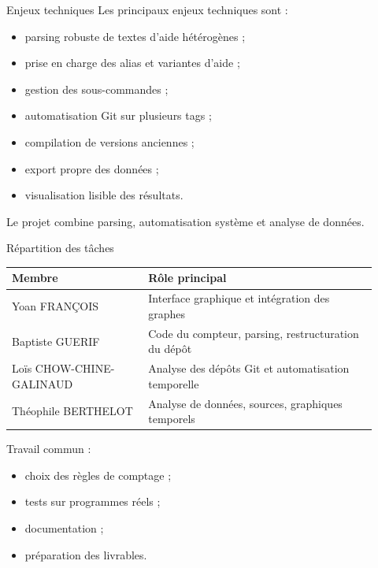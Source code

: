 \documentclass[10pt,aspectratio=169]{beamer}
\begin{document}
\begin{frame}{Enjeux techniques}
  Les principaux enjeux techniques sont :

  \begin{itemize}
    \item parsing robuste de textes d'aide hétérogènes ;
    \item prise en charge des alias et variantes d'aide ;
    \item gestion des sous-commandes ;
    \item automatisation Git sur plusieurs tags ;
    \item compilation de versions anciennes ;
    \item export propre des données ;
    \item visualisation lisible des résultats.
  \end{itemize}

  \vspace{0.3cm}
  Le projet combine parsing, automatisation système et analyse de données.
\end{frame}

\begin{frame}{Répartition des tâches}
  \small
  \begin{tabular}{p{0.34\linewidth} p{0.58\linewidth}}
    \toprule
    \textbf{Membre} & \textbf{Rôle principal} \\
    \midrule
    Yoan FRANÇOIS & Interface graphique et intégration des graphes \\
    Baptiste GUERIF & Code du compteur, parsing, restructuration du dépôt \\
    Loïs CHOW-CHINE-GALINAUD & Analyse des dépôts Git et automatisation temporelle \\
    Théophile BERTHELOT & Analyse de données, sources, graphiques temporels \\
    \bottomrule
  \end{tabular}

  \vspace{0.5cm}
  Travail commun :
  \begin{itemize}
    \item choix des règles de comptage ;
    \item tests sur programmes réels ;
    \item documentation ;
    \item préparation des livrables.
  \end{itemize}
\end{frame}
\end{document}
